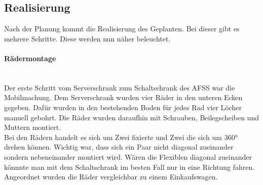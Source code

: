 \subsection{Realisierung}
    Nach der Planung kommt die Realisierung des Geplanten. Bei dieser gibt es mehrere Schritte. Diese werden nun näher beleuchtet.
    \paragraph{Rädermontage}\mbox{}\\
    Der erste Schritt vom Serverschrank zum Schaltschrank des AFSS war die Mobilmachung. Dem Serverschrank wurden vier Räder in den unteren Ecken gegeben. Dafür wurden in den bestehenden Boden für jedes Rad vier Löcher manuell gebohrt. Die Räder wurden daraufhin mit Schrauben, Beilegscheiben und Muttern montiert.\\
    Bei den Rädern handelt es sich um Zwei fixierte und Zwei die sich um 360° drehen können. Wichtig war, dass sich ein Paar nicht diagonal zueinander sondern nebeneinander montiert wird. Wären die Flexiblen diagonal zueinander könnnte man mit dem Schaltschrank im besten Fall nur in eine Richtung fahren. Angeordnet wurden die Räder vergleichbar zu einem Einkaufswagen.  

